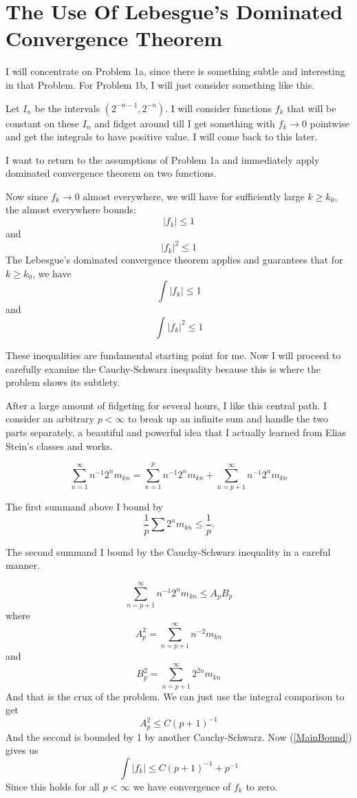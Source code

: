 \documentclass{amsart}
\begin{document}
\section{The Use Of Lebesgue's Dominated Convergence Theorem}

I will concentrate on Problem 1a, since there is something subtle and interesting in that Problem.  For Problem 1b, I will just consider something like this.

Let $I_n$ be the intervals $(2^{-n-1},2^{-n})$.  I will consider functions $f_k$ that will be constant on these $I_n$ and fidget around till I get something with $f_k\rightarrow 0$ pointwise and get the integrals to have positive value.  I will come back to this later.

I want to return to the assumptions of Problem 1a and immediately apply dominated convergence theorem on two functions.

Now since $f_k\rightarrow 0$ almost everywhere, we will have for sufficiently large $k\ge k_0$, the almost everywhere bounds:
\[
| f_k | \le 1
\]
and
\[
| f_k |^2 \le 1
\]
The Lebesgue's dominated convergence theorem applies and guarantees that for $k\ge k_0$, we have
\[
\int |f_k| \le 1
\]
and
\[
\int |f_k|^2 \le 1
\]

These inequalities are fundamental starting point for me.  Now I will proceed to carefully examine the Cauchy-Schwarz inequality because this is where the problem shows its subtlety.

After a large amount of fidgeting for several hours, I like this central path.  I consider an arbitrary $p <\infty$ to break up an infinite sum and handle the two parts separately, a beautiful and powerful idea that I actually learned from Elias Stein's classes and works.

\[
\sum_{n=1}^\infty {n^{-1}} 2^n m_{kn} = \sum_{n=1}^p {n^{-1}} 2^n m_{kn} + 
\sum_{n=p+1}^\infty {n^{-1}} 2^n m_{kn}
\]

The first summand above I bound by
\[
\frac{1}{p} \sum 2^n m_{kn} \le \frac{1}{p}.
\]

The second summand I bound by the Cauchy-Schwarz inequality in a careful manner.

\begin{equation}
\label{MainBound}
\sum_{n=p+1}^\infty n^{-1}2^n m_{kn} \le A_p B_p
\end{equation}
where
\[
A^2_p = \sum_{n=p+1}^\infty n^{-2}m_{kn}
\]
and
\[
B^2_p = \sum_{n=p+1}^\infty 2^{2n} m_{kn}
\]
And that is the crux of the problem.  We can just use the integral comparison to get
\[
A^2_p \le C(p+1)^{-1}
\]
And the second is bounded by 1 by another Cauchy-Schwarz.  Now (\eqref{MainBound}) gives us 
\[
\int |f_k| \le C(p+1)^{-1} + p^{-1}
\]
Since this holds for all $p <\infty$ we have convergence of $f_k$ to zero.
\end{document}
